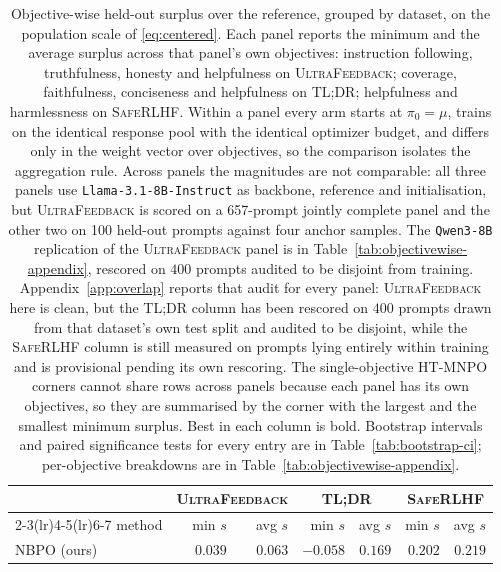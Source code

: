 \documentclass{article}
\theoremstyle{remark}
\theoremstyle{plain}
\newcommand{\NBPO}{\textsc{NBPO}}
\begin{document}
\begin{table}[t]
\centering\scriptsize
\setlength{\tabcolsep}{2.6pt}
\caption{Objective-wise held-out surplus over the reference, grouped by dataset, on the population scale
of \eqref{eq:centered}. Each panel reports the minimum and the average surplus across that panel's own
objectives: instruction following, truthfulness, honesty and helpfulness on \textsc{UltraFeedback};
coverage, faithfulness, conciseness and helpfulness on \textsc{TL;DR}; helpfulness and harmlessness on
\textsc{SafeRLHF}. Within a panel every arm starts at $\pi_0=\mu$, trains on the identical response pool
with the identical optimizer budget, and differs only in the weight vector over objectives, so the
comparison isolates the aggregation rule. Across panels the magnitudes are not comparable:
all three panels use \texttt{Llama-3.1-8B-Instruct} as backbone, reference and initialisation, but
\textsc{UltraFeedback} is scored on a 657-prompt jointly complete panel and the other two on 100 held-out
prompts against four anchor samples. The \texttt{Qwen3-8B} replication of the \textsc{UltraFeedback} panel
is in Table~\ref{tab:objectivewise-appendix}, rescored on $400$ prompts audited to be disjoint from
training. Appendix~\ref{app:overlap} reports that audit for every panel: \textsc{UltraFeedback} here is
clean, but the \textsc{TL;DR} column has been rescored on $400$ prompts drawn from that dataset's own
test split and audited to be disjoint, while the \textsc{SafeRLHF} column is still measured on prompts
lying entirely within training and is provisional pending its own rescoring. The single-objective HT-MNPO corners cannot share rows
across panels because each panel has its own objectives, so they are summarised by the corner with the
largest and the smallest minimum surplus. Best in each column is bold. Bootstrap intervals and paired significance tests for every entry are in Table~\ref{tab:bootstrap-ci}; per-objective breakdowns are in Table~\ref{tab:objectivewise-appendix}.}
\label{tab:multi-dataset-surplus}
\begin{tabular}{lrrrrrr}
\toprule
& \multicolumn{2}{c}{\textsc{UltraFeedback}} & \multicolumn{2}{c}{\textsc{TL;DR}} & \multicolumn{2}{c}{\textsc{SafeRLHF}}\\
\cmidrule(lr){2-3}\cmidrule(lr){4-5}\cmidrule(lr){6-7}
method & min $s$ & avg $s$ & min $s$ & avg $s$ & min $s$ & avg $s$\\
\midrule
\NBPO{} (ours) & $\mathbf{0.039}$ & $\mathbf{0.063}$ & $-0.058$ & $\mathbf{0.169}$ & $0.202$ & $0.219$\\

\end{tabular}
\end{table}
\end{document}
